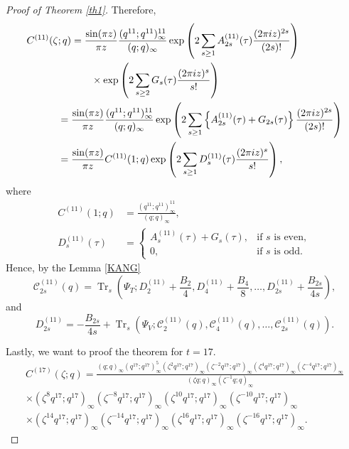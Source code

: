 \documentclass[12pt,oneside,reqno]{amsart}
\numberwithin{equation}{section}
\begin{document}
\begin{proof}[Proof of Theorem \ref{th1}]
	Therefore,
	\begin{align}
		C^{(11)}(\zeta;q)
		&=
		\frac{\sin(\pi z)}{\pi z}
		\frac{(q^{11};q^{11})_{\infty}^{11}}
		{(q;q)_{\infty}}
		\exp\left(
		2\sum_{s\ge1}
		A^{(11)}_{2s}(\tau)
		\frac{(2\pi iz)^{2s}}{(2s)!}
		\right)
		\notag\\
		&\qquad\times
		\exp\left(
		2\sum_{s\ge2}
		G_s(\tau)
		\frac{(2\pi iz)^s}{s!}
		\right)
		\notag\\
		={}&
		\frac{\sin(\pi z)}{\pi z}
		\frac{(q^{11};q^{11})_{\infty}^{11}}
		{(q;q)_{\infty}}
		\exp\left(
		2\sum_{s\ge1}
		\left\{
		A^{(11)}_{2s}(\tau)+G_{2s}(\tau)
		\right\}
		\frac{(2\pi iz)^{2s}}{(2s)!}
		\right)
		\notag\\
		={}&
		\frac{\sin(\pi z)}{\pi z}
		C^{(11)}(1;q)
		\exp\left(
		2\sum_{s\ge1}
		D^{(11)}_{s}(\tau)
		\frac{(2\pi iz)^s}{s!}
		\right),
		\label{eq:11coreD}
	\end{align}
	where
	\begin{align*}
		C^{(11)}(1;q)
		&=
		\frac{(q^{11};q^{11})_{\infty}^{11}}
		{(q;q)_{\infty}},\\
		D^{(11)}_{s}(\tau)
		&=
		\begin{cases}
			A^{(11)}_{s}(\tau)+G_s(\tau), & \text{if } s \text{ is even},\\[6pt]
			0, & \text{if } s \text{ is odd}.
		\end{cases}
	\end{align*}
	Hence, by the Lemma \eqref{KANG}
	\[
	\mathcal{C}_{2s}^{(11)}(q)
	=
	\operatorname{Tr}_s
	\left(
	\Psi_T;
	D^{(11)}_{2}+\frac{B_2}{4},
	D^{(11)}_{4}+\frac{B_4}{8},
	\ldots,
	D^{(11)}_{2s}+\frac{B_{2s}}{4s}
	\right),
	\]
	and
	\[
	D^{(11)}_{2s}
	=
	-\frac{B_{2s}}{4s}
	+
	\operatorname{Tr}_s
	\left(
	\Psi_V;
	\mathcal{C}_2^{(11)}(q),
	\mathcal{C}_4^{(11)}(q),
	\ldots,
	\mathcal{C}_{2s}^{(11)}(q)
	\right).
	\]
	
	
	
	Lastly, we want to proof the theorem for $t=17$.
	\begin{equation}
		\begin{aligned}
			C^{(17)}(\zeta;q)
			=
			\frac{
				(q;q)_{\infty}(q^{17};q^{17})_{\infty}^{5}
				(\zeta^{2}q^{17};q^{17})_{\infty}
				(\zeta^{-2}q^{17};q^{17})_{\infty}
				(\zeta^{4}q^{17};q^{17})_{\infty}
				(\zeta^{-4}q^{17};q^{17})_{\infty}
			}{(\zeta q;q)_{\infty}(\zeta^{-1}q;q)_{\infty}}
			\\[2mm]
			\times
			(\zeta^{8}q^{17};q^{17})_{\infty}
			(\zeta^{-8}q^{17};q^{17})_{\infty}
			(\zeta^{10}q^{17};q^{17})_{\infty}
			(\zeta^{-10}q^{17};q^{17})_{\infty}
			\\[2mm]
			\times
			(\zeta^{14}q^{17};q^{17})_{\infty}
			(\zeta^{-14}q^{17};q^{17})_{\infty}
			(\zeta^{16}q^{17};q^{17})_{\infty}
			(\zeta^{-16}q^{17};q^{17})_{\infty}.
		\end{aligned}
		\label{eq:17corecrank}
	\end{equation}
	

\end{proof}
\end{document}
